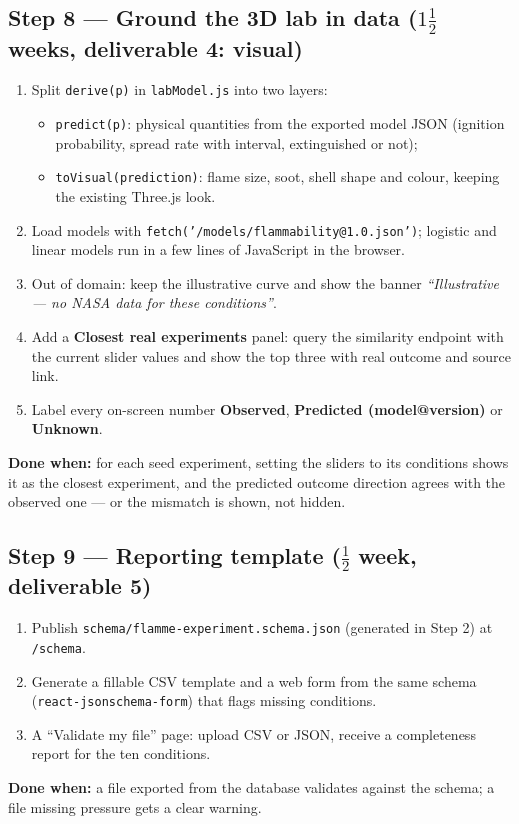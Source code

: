 \documentclass[11pt,a4paper]{article}
\newcommand{\code}[1]{\texttt{#1}}
\newcommand{\done}[1]{\begin{donebox}\textbf{Done when:} #1\end{donebox}}
\begin{document}
\subsection{Step 8 --- Ground the 3D lab in data \hfill\normalfont\small ($1\tfrac{1}{2}$ weeks, deliverable 4: visual)}
\begin{enumerate}
  \item Split \code{derive(p)} in \code{labModel.js} into two layers:
  \begin{itemize}
    \item \code{predict(p)}: physical quantities from the exported model JSON (ignition probability, spread rate with interval, extinguished or not);
    \item \code{toVisual(prediction)}: flame size, soot, shell shape and colour, keeping the existing Three.js look.
  \end{itemize}
  \item Load models with \code{fetch('/models/flammability@1.0.json')}; logistic and linear models run in a few lines of JavaScript in the browser.
  \item Out of domain: keep the illustrative curve and show the banner \emph{``Illustrative --- no NASA data for these conditions''}.
  \item Add a \textbf{Closest real experiments} panel: query the similarity endpoint with the current slider values and show the top three with real outcome and source link.
  \item Label every on-screen number \textbf{Observed}, \textbf{Predicted (model@version)} or \textbf{Unknown}.
\end{enumerate}
\done{for each seed experiment, setting the sliders to its conditions shows it as the closest experiment, and the predicted outcome direction agrees with the observed one --- or the mismatch is shown, not hidden.}

\subsection{Step 9 --- Reporting template \hfill\normalfont\small ($\tfrac{1}{2}$ week, deliverable 5)}
\begin{enumerate}
  \item Publish \code{schema/flamme-experiment.schema.json} (generated in Step 2) at \code{/schema}.
  \item Generate a fillable CSV template and a web form from the same schema (\code{react-jsonschema-form}) that flags missing conditions.
  \item A ``Validate my file'' page: upload CSV or JSON, receive a completeness report for the ten conditions.
\end{enumerate}
\done{a file exported from the database validates against the schema; a file missing pressure gets a clear warning.}
\end{document}
